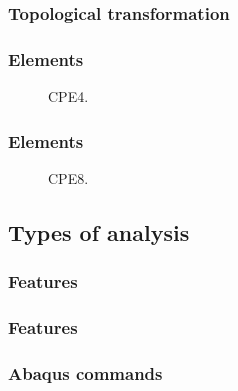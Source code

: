 \documentclass[first,firstsupp,lastsupp,handout,last,hyperref,table]{ETHclass}
\begin{document}
\begin{frame}
\frametitle{Topological transformation}
\vspace{-0.75cm}
\centering
\begin{figure}[!h]
\centering
  \label{fig:topo_transf}
\end{figure}
\end{frame}

\begin{frame}
\frametitle{Elements}
\vspace{-0.75cm}
\centering
\begin{figure}[!h]
\centering
  \caption{\scriptsize CPE4.}
  \label{fig:cpe4}
\end{figure}
\end{frame}

\begin{frame}
\frametitle{Elements}
\vspace{-0.75cm}
\centering
\begin{figure}[!h]
\centering
  \caption{\scriptsize CPE8.}
  \label{fig:cpe8}
\end{figure}
\end{frame}

\subsection{Types of analysis}

\begin{frame}
\frametitle{Features}
\vspace*{-0.25cm}
\centering

\end{frame}

\begin{frame}
\frametitle{Features}
\vspace*{-0.5cm}
\centering

\end{frame}

\begin{frame}
\frametitle{Abaqus commands}
\centering

\end{frame}
\end{document}
